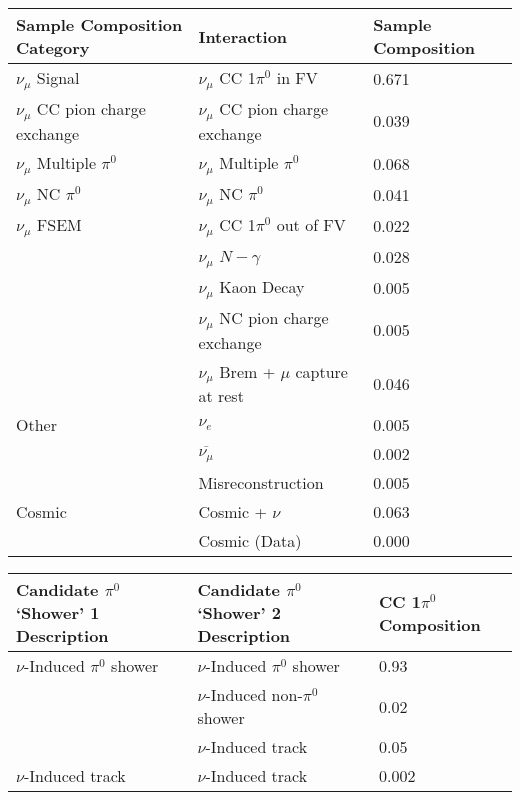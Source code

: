 \begin{table}[H]
\centering
{}
 \begin{tabular}{|l|l|l|}
 \hline
Sample Composition Category & Interaction & Sample Composition \\ [0.1ex] \hline
$\nu_\mu$ Signal & $\nu_\mu$ CC 1$\pi^0$ in FV & 0.671 \\ \hline
$\nu_\mu$ CC pion charge exchange & $\nu_\mu$ CC pion charge exchange & 0.039 \\ \hline
$\nu_\mu$ Multiple $\pi^0$ & $\nu_\mu$ Multiple $\pi^0$ & 0.068 \\ \hline
$\nu_\mu$ NC $\pi^0$ & $\nu_\mu$ NC $\pi^0$ & 0.041 \\ \hline
$\nu_\mu$ FSEM & $\nu_\mu$ CC 1$\pi^0$ out of FV & 0.022 \\
& $\nu_\mu$ $N-\gamma$ & 0.028 \\
& $\nu_\mu$ Kaon Decay & 0.005 \\
& $\nu_\mu$ NC pion charge exchange & 0.005 \\ 
&$\nu_\mu$ Brem + $\mu$ capture at rest & 0.046 \\ \hline
Other & $\nu_e$ &0.005 \\
&$\overline{\nu_\mu}$ & 0.002 \\
& Misreconstruction & 0.005 \\ \hline
Cosmic & Cosmic + $\nu$ & 0.063 \\
& Cosmic (Data) & 0.000 \\ \hline
\end{tabular}
\end{table}

\begin{table}[H]
\centering
{}
 \begin{tabular}{|l|l|l|}
 \hline
Candidate $\pi^0$ `Shower' 1 Description & Candidate $\pi^0$ `Shower' 2 Description & CC 1$\pi^0$ Composition \\ [0.1ex] \hline
$\nu$-Induced $\pi^0$ shower & $\nu$-Induced $\pi^0$ shower & 0.93 \\ 
& $\nu$-Induced non-$\pi^0$ shower & 0.02 \\ 
& $\nu$-Induced track & 0.05 \\ 
$\nu$-Induced track & $\nu$-Induced track & 0.002 \\ \hline
\end{tabular}
\end{table}


